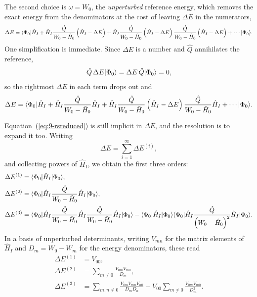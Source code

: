 The second choice is $\omega=W_0$, the \emph{unperturbed} reference energy,
which removes the exact energy from the denominators at the cost of leaving
$\Delta E$ in the numerators,
\begin{equation}
  \Delta E = \langle \Phi_0 | 
    \hat{H}_I
    + \hat{H}_I\frac{\hat{Q}}{W_0-\hat{H}_0}
      \left(\hat{H}_I-\Delta E\right)
    + \hat{H}_I\frac{\hat{Q}}{W_0-\hat{H}_0}
      \left(\hat{H}_I-\Delta E\right)
      \frac{\hat{Q}}{W_0-\hat{H}_0}
      \left(\hat{H}_I-\Delta E\right)
    + \cdots | \Phi_0 \rangle.
  \label{eq:9-rsseries}
\end{equation}
One simplification is immediate.  Since $\Delta E$ is a number and $\hat{Q}$
annihilates the reference,
\begin{equation}
  \hat{Q}\,\Delta E\vert \Phi_0 \rangle = \Delta E\,\hat{Q}\vert \Phi_0 \rangle = 0,
  \label{eq:9-Qkills}
\end{equation}
so the rightmost $\Delta E$ in each term drops out and
\begin{equation}
  \Delta E = \langle \Phi_0 | 
    \hat{H}_I
    + \hat{H}_I\frac{\hat{Q}}{W_0-\hat{H}_0}\hat{H}_I
    + \hat{H}_I\frac{\hat{Q}}{W_0-\hat{H}_0}
      \left(\hat{H}_I-\Delta E\right)
      \frac{\hat{Q}}{W_0-\hat{H}_0}\hat{H}_I
    + \cdots | \Phi_0 \rangle.
  \label{eq:9-rsreduced}
\end{equation}

Equation~(\ref{eq:9-rsreduced}) is still implicit in $\Delta E$, and the
resolution is to expand it too.  Writing
\begin{equation}
  \Delta E = \sum_{i=1}^{\infty}\Delta E^{(i)},
  \label{eq:9-orderbyorder}
\end{equation}
and collecting powers of $\hat{H}_I$, we obtain the first three orders:
\begin{align}
  \Delta E^{(1)} &= \langle \Phi_0 | \hat{H}_I | \Phi_0 \rangle,
  \label{eq:9-E1}\\[2pt]
  \Delta E^{(2)} &= \langle \Phi_0 | \hat{H}_I
    \frac{\hat{Q}}{W_0-\hat{H}_0}\hat{H}_I | \Phi_0 \rangle,
  \label{eq:9-E2}\\[2pt]
  \Delta E^{(3)} &= \langle \Phi_0 | \hat{H}_I
      \frac{\hat{Q}}{W_0-\hat{H}_0}\hat{H}_I
      \frac{\hat{Q}}{W_0-\hat{H}_0}\hat{H}_I | \Phi_0 \rangle
    - \langle \Phi_0 | \hat{H}_I | \Phi_0 \rangle
      \langle \Phi_0 | \hat{H}_I
      \frac{\hat{Q}}{\left(W_0-\hat{H}_0\right)^2}
      \hat{H}_I | \Phi_0 \rangle.
  \label{eq:9-E3}
\end{align}
In a basis of unperturbed determinants, writing $V_{mn}$ for the matrix
elements of $\hat{H}_I$ and $D_m=W_0-W_m$ for the energy denominators, these
read
\begin{align}
  \Delta E^{(1)} &= V_{00},
  \label{eq:9-E1sum}\\
  \Delta E^{(2)} &= \sum_{m\ne0}\frac{V_{0m}V_{m0}}{D_m},
  \label{eq:9-E2sum}\\
  \Delta E^{(3)} &= \sum_{m,n\ne0}
      \frac{V_{0m}V_{mn}V_{n0}}{D_mD_n}
    - V_{00}\sum_{m\ne0}\frac{V_{0m}V_{m0}}{D_m^2}.
  \label{eq:9-E3sum}
\end{align}

